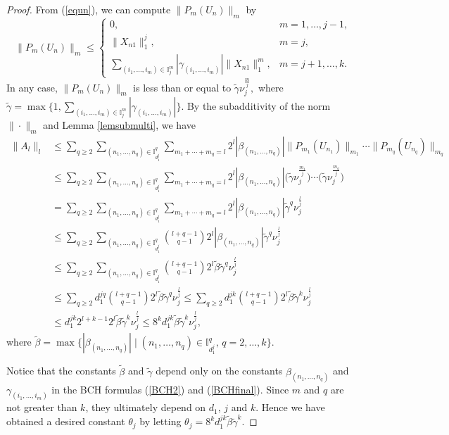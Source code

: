\documentclass[pdftex]{sigma}
\numberwithin{equation}{section}
\begin{document}
\begin{proof}
From (\ref{equn}),
we can compute $\|P_m(U_n)\|_m$ by
\[
\|P_m(U_n)\|_m\leq\begin{cases}
 0, & m=1,\dots,j-1,\\
\|X_{n1}\|_1^j, & m=j,\\
\sum_{(i_1,\dots,i_m)\in\mathbb{I}_j^m}|\gamma_{(i_1,\dots,i_m)}|
\|X_{n1}\|_1^m, & m=j+1,\dots,k.
\end{cases}
\]
In any case,
$\|P_m(U_n)\|_m$ is less than or equal to $\tilde{\gamma}\nu_j^{\frac{m}{j}},$
where $\tilde{\gamma}\!=\!\max\big\{1,\sum_{(i_1,\dots,i_m)\in \mathbb{I}_j^m}\!|\gamma_{(i_1,\dots,i_m)}|\big\}$.
By the subadditivity of the norm $\|\cdot\|_m$ and Lemma \ref{lemsubmulti},
we have
\begin{align*}
 \|A_l\|_l&\leq\sum_{q\geq2}\sum_{(n_1,\dots,n_{q})\in\mathbb{I}_{d_1^j}^q}\sum_{m_1+\cdots+m_q=l}2^l  |\beta_{(n_1,\dots,n_q)}|  \|P_{m_1}(U_{n_1})\|_{m_1}\cdots\|P_{m_q}(U_{n_q})\|_{m_q}
 \\
 &\leq \sum_{q\geq2}\sum_{(n_1,\dots,n_q)\in \mathbb{I}_{d_1^j}^q}\sum_{m_1+\cdots+m_q=l}2^l  |\beta_{(n_1,\dots,n_q)}| \big(\tilde{\gamma}\nu_j^{\frac{m_1}{j}}\big)\cdots \big(\tilde{\gamma}\nu_j^{\frac{m_q}{j}}\big)
 \\
 &= \sum_{q\geq2}\sum_{(n_1,\dots,n_q)\in \mathbb{I}_{d_1^j}^q}\sum_{m_1+\cdots+m_q=l} 2^l  |\beta_{(n_1,\dots,n_q)}|  \tilde{\gamma}^q  \nu_j^{\frac{l}{j}}
 \\
 &\leq \sum_{q\geq2}\sum_{(n_1,\dots,n_q)\in \mathbb{I}_{d_1^j}^q}\binom{l+q-1}{q-1}   2^l  |\beta_{(n_1,\dots,n_q)}|  \tilde{\gamma}^q  \nu_j^{\frac{l}{j}}
 \\
 &\leq\sum_{q\geq2}\sum_{(n_1,\dots,n_q)\in \mathbb{I}_{d_1^j}^q} \binom{l+q-1}{q-1}  2^l  \tilde{\beta}  \tilde{\gamma}^q  \nu_j^{\frac{l}{j}}
 \\
 &\leq\sum_{q\geq2}d_1^{jq}  \binom{l+q-1}{q-1}  2^l  \tilde{\beta}  \tilde{\gamma}^q  \nu_j^{\frac{l}{j}}
 \leq\sum_{q\geq2}d_1^{jk}  \binom{l+q-1}{q-1}  2^l  \tilde{\beta}  \tilde{\gamma}^k  \nu_j^{\frac{l}{j}}
 \\
 &\leq d_1^{jk}  2^{l+k-1}  2^l  \tilde{\beta}  \tilde{\gamma}^k  \nu_j^{\frac{l}{j}}
 \leq 8^k  d_1^{jk} \tilde{\beta}  \tilde{\gamma}^k  \nu_j^{\frac{l}{j}},
\end{align*}
where $\tilde{\beta}=\max\big\{|\beta_{(n_1,\dots,n_q)}|\mid (n_1,\dots,n_q)\in \mathbb{I}_{d_1^j}^q,\,q=2,\dots,k\big\}$.

Notice that the constants $\tilde{\beta}$ and $\tilde{\gamma}$ depend only on the constants $\beta_{(n_1,\dots,n_q)}$ and $\gamma_{(i_1,\dots,i_m)}$ in the BCH formulas (\ref{BCH2}) and (\ref{BCHfinal}).
Since $m$ and $q$ are not greater than $k$,
they ultimately depend on $d_1$, $j$ and $k$.
Hence we have obtained a desired constant $\theta_j$ by letting
$\theta_j=8^kd_1^{jk}\tilde{\beta}\tilde{\gamma}^k.$
\end{proof}
\end{document}
